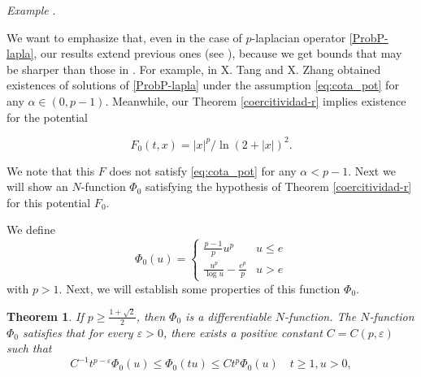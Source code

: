 \documentclass[twoside]{article}
\newtheorem{thm}{Theorem}[section]
\theoremstyle{remark}
\renewcommand{\leq}{\leqslant}
\renewcommand{\geq}{\geqslant}
\newcounter{example}
\newenvironment{example}{\noindent\textit{Example} \arabic{example}.}{\addtocounter{example}{1}}
\begin{document}
\begin{example}\end{example}
We want to emphasize that, even in the case of $p$-laplacian operator \eqref{ProbP-lapla}, our results  extend  previous ones (see \cite{tang1998periodic, tang2010periodic}), because
 we get bounds that may be  sharper than those in \cite{tang1998periodic,tang2010periodic}. 
For example, in  \cite[Th. 2.1]{tang2010periodic} X. Tang and X. Zhang obtained existences of solutions of \eqref{ProbP-lapla}
under the assumption \eqref{eq:cota_pot}
 for any $\alpha\in (0,p-1)$. Meanwhile, our Theorem \ref{coercitividad-r} implies existence for the potential

 \[F_0(t,x)=|x|^p/\ln(2+|x|)^2.\]

 We note that this $F$ does not satisfy \eqref{eq:cota_pot} for any $\alpha<p-1$.  
Next we will show  an $N$-function $\Phi_0$ satisfying the hypothesis of Theorem \ref{coercitividad-r} for this potential $F_0$.


We define
\[\Phi_0(u)=
\left\{
\begin{array}{ll}
\frac{p-1}{p}u^p&u\leq e
\\
\frac{u^p}{\log u}-\frac{e^p}{p}&u>e
\end{array}
\right.\]
with $p>1$. Next, we will establish some properties of this function $\Phi_0$.

\begin{thm}
If $p\geq \frac{1+\sqrt 2}{2}$, then $\Phi_0$ is a differentiable $N$-function. 
The $N$-function $\Phi_0$ satisfies that for every $\varepsilon>0$, there exists a positive constant $C=C(p,\varepsilon)$  such that
\begin{equation}\label{cota-sup-indices}
C^{-1}t^{p-\varepsilon}\Phi_0(u)\leq \Phi_0(tu) \leq Ct^p\Phi_0(u)\quad t\geq 1, u>0,
\end{equation}

\end{thm}
\end{document}
